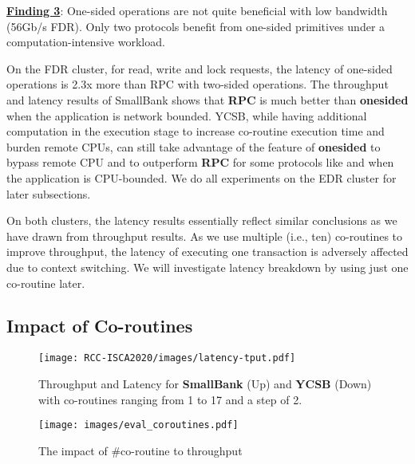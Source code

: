 \underline{\bf  Finding 3}: 
One-sided operations are not quite beneficial with 
low bandwidth (56Gb/s FDR). Only two protocols benefit from one-sided primitives under a computation-intensive workload.

On the FDR cluster, for read, write and lock requests, the latency of one-sided operations is 2.3x more than RPC with two-sided operations. The throughput and latency results of SmallBank shows that \textbf{RPC} is much better than \textbf{onesided} when the application is network bounded. YCSB, while having additional computation in the execution stage to increase co-routine execution time and burden remote CPUs, can still take advantage of the feature of \textbf{onesided} to bypass remote CPU and to outperform \textbf{RPC} for some protocols like \mvcc and \occ when the application is CPU-bounded. We do all experiments on the EDR cluster for later subsections.

On both clusters, the latency results essentially reflect similar conclusions as we have drawn from throughput results. As we use multiple (i.e., ten) co-routines to improve throughput, the latency of executing one transaction is adversely affected due to context switching. We will investigate latency breakdown by using just one co-routine later.

\vspace{-2mm}
\subsection{Impact of Co-routines}
\vspace{-2mm}

\begin{figure}[h]
    \centering
    \texttt{[image: RCC-ISCA2020/images/latency-tput.pdf]}
    \vspace{-0.4cm}
    \caption{Throughput and Latency for \textbf{SmallBank} (Up) and \textbf{YCSB} (Down) with co-routines ranging from 1 to 17 and a step of 2.}
    \label{fig:coroutine-latency-tput}
\end{figure}

\begin{figure}[b]
    \centering
    \vspace{-0.6cm}
    \texttt{[image: images/eval\_coroutines.pdf]}
    \vspace{-0.4cm}
    \caption{The impact of \#co-routine to throughput}
    \vspace{-0.2cm}
    \label{fig:eval_cor_curve}
\end{figure}

